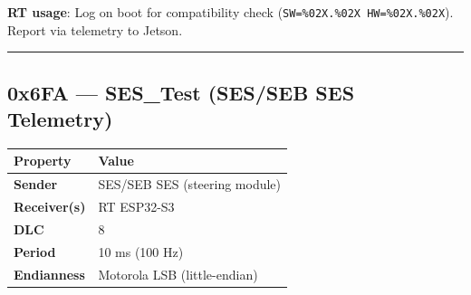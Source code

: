\documentclass[12pt,a4paper,oneside]{report}
\begin{document}
\textbf{RT usage}: Log on boot for compatibility check
(\texttt{SW=\%02X.\%02X\ HW=\%02X.\%02X}). Report via telemetry to Jetson.

\begin{center}\rule{0.5\linewidth}{0.5pt}\end{center}

\subsection{0x6FA --- SES\_Test (SES/SEB SES
Telemetry)}\label{x6fa-ses_test-SES/SEB-SES-telemetry}

\begin{longtable}[]{@{}ll@{}}
\toprule\noalign{}
Property & Value \\
\midrule\noalign{}
\endhead
\bottomrule\noalign{}
\endlastfoot
\textbf{Sender} & SES/SEB SES (steering module) \\
\textbf{Receiver(s)} & RT ESP32-S3 \\
\textbf{DLC} & 8 \\
\textbf{Period} & 10 ms (100 Hz) \\
\textbf{Endianness} & Motorola LSB (little-endian) \\
\end{longtable}
\end{document}
